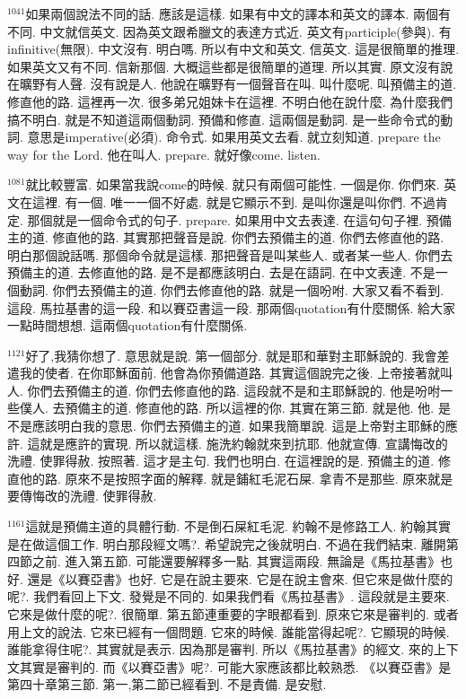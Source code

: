 \documentclass{book}
\begin{document}
$^{1041}$如果兩個說法不同的話.
應該是這樣.
如果有中文的譯本和英文的譯本.
兩個有不同.
中文就信英文.
因為英文跟希臘文的表達方式近.
英文有participle(參與).
有infinitive(無限).
中文沒有.
明白嗎.
所以有中文和英文.
信英文.
這是很簡單的推理.
如果英文又有不同.
信新那個.
大概這些都是很簡單的道理.
所以其實.
原文沒有說在曠野有人聲.
沒有說是人.
他說在曠野有一個聲音在叫.
叫什麼呢.
叫預備主的道.
修直他的路.
這裡再一次.
很多弟兄姐妹卡在這裡.
不明白他在說什麼.
為什麼我們搞不明白.
就是不知道這兩個動詞.
預備和修直.
這兩個是動詞.
是一些命令式的動詞.
意思是imperative(必須).
命令式.
如果用英文去看.
就立刻知道.
prepare the way for the Lord.
他在叫人.
prepare.
就好像come.
listen.

$^{1081}$就比較豐富.
如果當我說come的時候.
就只有兩個可能性.
一個是你.
你們來.
英文在這裡.
有一個.
唯一一個不好處.
就是它顯示不到.
是叫你還是叫你們.
不過肯定.
那個就是一個命令式的句子.
prepare.
如果用中文去表達.
在這句句子裡.
預備主的道.
修直他的路.
其實那把聲音是說.
你們去預備主的道.
你們去修直他的路.
明白那個說話嗎.
那個命令就是這樣.
那把聲音是叫某些人.
或者某一些人.
你們去預備主的道.
去修直他的路.
是不是都應該明白.
去是在語詞.
在中文表達.
不是一個動詞.
你們去預備主的道.
你們去修直他的路.
就是一個吩咐.
大家又看不看到.
這段.
馬拉基書的這一段.
和以賽亞書這一段.
那兩個quotation有什麼關係.
給大家一點時間想想.
這兩個quotation有什麼關係.

$^{1121}$好了,我猜你想了.
意思就是說.
第一個部分.
就是耶和華對主耶穌說的.
我會差遣我的使者.
在你耶穌面前.
他會為你預備道路.
其實這個說完之後.
上帝接著就叫人.
你們去預備主的道.
你們去修直他的路.
這段就不是和主耶穌說的.
他是吩咐一些僕人.
去預備主的道.
修直他的路.
所以這裡的你.
其實在第三節.
就是他.
他.
是不是應該明白我的意思.
你們去預備主的道.
如果我簡單說.
這是上帝對主耶穌的應許.
這就是應許的實現.
所以就這樣.
施洗約翰就來到抗耶.
他就宣傳.
宣講悔改的洗禮.
使罪得赦.
按照著.
這才是主句.
我們也明白.
在這裡說的是.
預備主的道.
修直他的路.
原來不是按照字面的解釋.
就是鋪紅毛泥石屎.
拿青不是那些.
原來就是要傳悔改的洗禮.
使罪得赦.

$^{1161}$這就是預備主道的具體行動.
不是倒石屎紅毛泥.
約翰不是修路工人.
約翰其實是在做這個工作.
明白那段經文嗎?.
希望說完之後就明白.
不過在我們結束.
離開第四節之前.
進入第五節.
可能還要解釋多一點.
其實這兩段.
無論是《馬拉基書》也好.
還是《以賽亞書》也好.
它是在說主要來.
它是在說主會來.
但它來是做什麼的呢?.
我們看回上下文.
發覺是不同的.
如果我們看《馬拉基書》.
這段就是主要來.
它來是做什麼的呢?.
很簡單.
第五節連重要的字眼都看到.
原來它來是審判的.
或者用上文的說法.
它來已經有一個問題.
它來的時候.
誰能當得起呢?.
它顯現的時候.
誰能拿得住呢?.
其實就是表示.
因為那是審判.
所以《馬拉基書》的經文.
來的上下文其實是審判的.
而《以賽亞書》呢?.
可能大家應該都比較熟悉.
《以賽亞書》是第四十章第三節.
第一,第二節已經看到.
不是責備.
是安慰.
\end{document}
